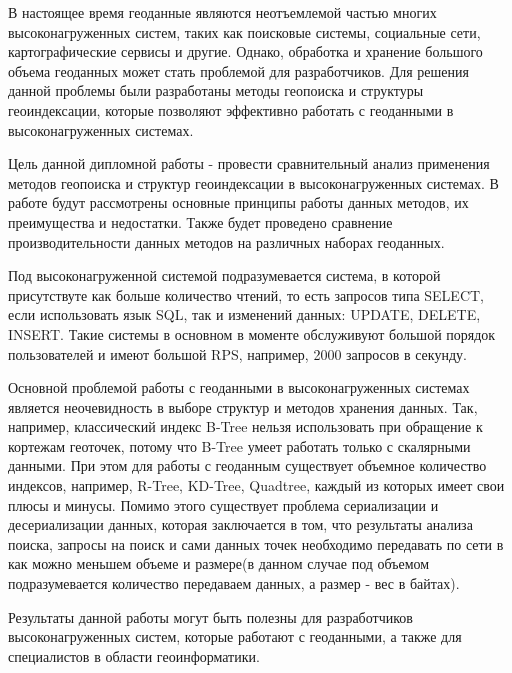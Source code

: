 \Introduction

В настоящее время геоданные являются неотъемлемой частью многих высоконагруженных систем, таких как поисковые системы, социальные сети, картографические сервисы и другие. Однако, обработка и хранение большого объема геоданных может стать проблемой для разработчиков. Для решения данной проблемы были разработаны методы геопоиска и структуры геоиндексации, которые позволяют эффективно работать с геоданными в высоконагруженных системах.

Цель данной дипломной работы - провести сравнительный анализ применения методов геопоиска и структур геоиндексации в высоконагруженных системах. В работе будут рассмотрены основные принципы работы данных методов, их преимущества и недостатки. Также будет проведено сравнение производительности данных методов на различных наборах геоданных.

Под высоконагруженной системой подразумевается система, в которой присутствуте как больше количество чтений, то есть запросов типа SELECT, если использовать язык SQL, так и изменений данных: UPDATE, DELETE, INSERT. Такие системы в основном в моменте обслуживуют большой порядок пользователей и имеют большой RPS, например, 2000 запросов в секунду.

Основной проблемой работы с геоданными в высоконагруженных системах является неочевидность в выборе структур и методов хранения данных. Так, например, классический индекс B-Tree нельзя использовать при обращение к кортежам геоточек, потому что B-Tree умеет работать только с скалярными данными. При этом для работы с геоданным существует объемное количество индексов, например, R-Tree, KD-Tree, Quadtree, каждый из которых имеет свои плюсы и минусы. Помимо этого существует проблема сериализации и десериализации данных, которая заключается в том, что результаты анализа поиска, запросы на поиск и сами данных точек необходимо передавать по сети в как можно меньшем объеме и размере(в данном случае под объемом подразумевается количество передаваем данных, а размер - вес в байтах).

Результаты данной работы могут быть полезны для разработчиков высоконагруженных систем, которые работают с геоданными, а также для специалистов в области геоинформатики.
